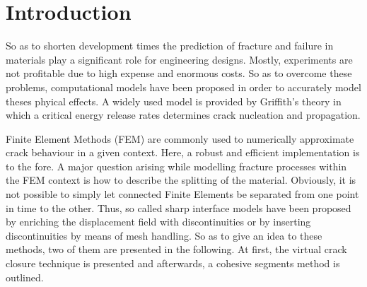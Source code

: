 \section{Introduction} \label{sec:intro}

So as to shorten development times the prediction of fracture and failure in materials play a significant role for engineering designs. Mostly, experiments are not profitable due to high expense and enormous costs. So as to overcome these problems, computational models have been proposed in order to accurately model theses phyical effects. A widely used model is provided by  Griffith's theory in which a critical energy release rates determines crack nucleation and propagation.

Finite Element Methods (FEM) are commonly used to numerically approximate crack behaviour in a given context. Here, a robust and efficient implementation is to the fore. A major question arising while modelling fracture processes within the FEM context is how to describe the splitting of the material. Obviously, it is not possible to simply let connected Finite Elements be separated from one point in time to the other. Thus, so called sharp interface models have been proposed by enriching the displacement field with discontinuities or by inserting discontinuities by means of mesh handling. So as to give an idea to these methods, two of them are presented in the following. At first, the virtual crack closure technique is presented and afterwards, a cohesive segments method is outlined.

